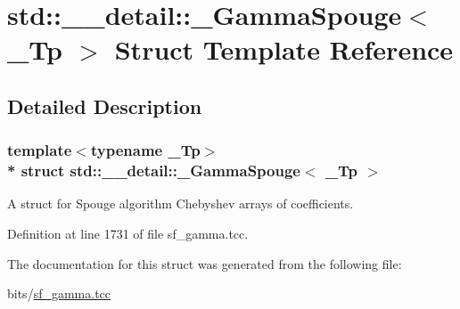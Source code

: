 \hypertarget{structstd_1_1____detail_1_1__GammaSpouge}{}\section{std\+:\+:\+\_\+\+\_\+detail\+:\+:\+\_\+\+Gamma\+Spouge$<$ \+\_\+\+Tp $>$ Struct Template Reference}
\label{structstd_1_1____detail_1_1__GammaSpouge}


\subsection{Detailed Description}
\subsubsection*{template$<$typename \+\_\+\+Tp$>$\\*
struct std\+::\+\_\+\+\_\+detail\+::\+\_\+\+Gamma\+Spouge$<$ \+\_\+\+Tp $>$}

A struct for Spouge algorithm Chebyshev arrays of coefficients. 

Definition at line 1731 of file sf\+\_\+gamma.\+tcc.



The documentation for this struct was generated from the following file\+:\begin{DoxyCompactItemize}
\item 
bits/\hyperlink{sf__gamma_8tcc}{sf\+\_\+gamma.\+tcc}\end{DoxyCompactItemize}
